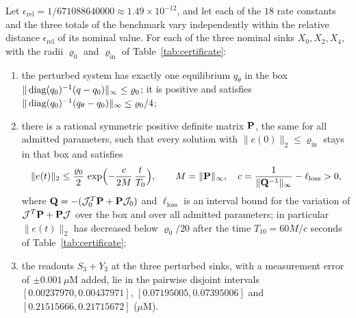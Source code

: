 \begin{proposition}\label{prop:certificate}
Let \(\epsilon_{\mathrm{rel}}=1/671088640000\approx1.49\times10^{-12}\), and let each of the
\(18\) rate constants and the three totals of the benchmark vary independently within the
relative distance \(\epsilon_{\mathrm{rel}}\) of its nominal value. For each of the three
nominal sinks \(X_0,X_2,X_4\), with the radii \(\varrho_0\) and \(\varrho_{\mathrm{in}}\) of
Table~\ref{tab:certificate}:
\begin{enumerate}
\item[\textup{(i)}] the perturbed system has exactly one equilibrium \(q_\theta\) in the box
\(\|\operatorname{diag}(q_0)^{-1}(q-q_0)\|_\infty\le\varrho_0\); it is positive and satisfies
\(\|\operatorname{diag}(q_0)^{-1}(q_\theta-q_0)\|_\infty\le\varrho_0/4\);
\item[\textup{(ii)}] there is a rational symmetric positive definite matrix \(\mathbf P\), the same
for all admitted parameters, such that every solution with \(\|e(0)\|_2\le\varrho_{\mathrm{in}}\)
stays in that box and satisfies
\[
 \|e(t)\|_2\le\frac{\varrho_0}{2}\,\exp\Bigl(-\frac{c}{2M}\,\frac{t}{T_0}\Bigr),
 \qquad M=\|\mathbf P\|_\infty,\quad c=\frac{1}{\|\mathbf Q^{-1}\|_\infty}-\ell_{\mathrm{loss}}>0,
\]
where \(\mathbf Q=-(\mathcal J_0^{T}\mathbf P+\mathbf P\mathcal J_0)\) and \(\ell_{\mathrm{loss}}\) is an interval bound for the
variation of \(\mathcal J^{T}\mathbf P+\mathbf P\mathcal J\) over the box and over all admitted parameters; in particular
\(\|e(t)\|_2\) has decreased below \(\varrho_0/20\) after the time \(T_{10}=60M/c\) seconds of
Table~\ref{tab:certificate};
\item[\textup{(iii)}] the readouts \(S_3+Y_3\) at the three perturbed sinks, with a measurement
error of \(\pm0.001\,\mu\mathrm M\) added, lie in the pairwise disjoint intervals
\([0.00237970,0.00437971]\), \([0.07195005,0.07395006]\) and
\([0.21515666,0.21715672]\) (\(\mu\)M).
\end{enumerate}
\end{proposition}
